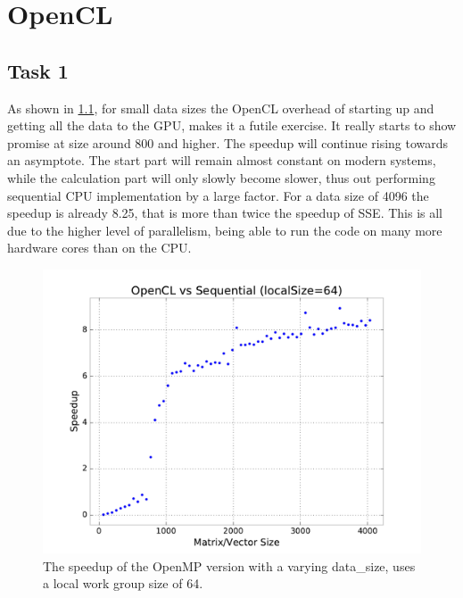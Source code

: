 \documentclass[final]{report}
\begin{document}
\chapter{OpenCL}

\section{Task 1}
As shown in \cref{fig:opencl-data-size-sweep}, for small data sizes the OpenCL overhead of starting up and getting all the data to the GPU, makes it a futile exercise.
It really starts to show promise at size around 800 and higher.
The speedup will continue rising towards an asymptote.
The start part will remain almost constant on modern systems, while the calculation part will only slowly become slower, thus out performing sequential CPU implementation by a large factor.
For a data size of 4096 the speedup is already 8.25, that is more than twice the speedup of SSE.
This is all due to the higher level of parallelism, being able to run the code on many more hardware cores than on the CPU.
\begin{figure}[H]
\centering
    \includegraphics[width=\linewidth]{resources/opencl-data-size-sweep.pdf}
    \caption{The speedup of the OpenMP version with a varying data\_size, uses a local work group size of 64.}
    \label{fig:opencl-data-size-sweep}
\end{figure}
\end{document}
